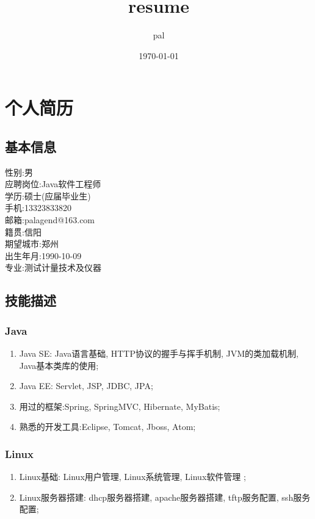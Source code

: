 \documentclass[11pt]{ctexart}
\author{pal}
\date{\today}
\title{resume}
\begin{document}
\maketitle
\tableofcontents

\section{个人简历}
\label{sec-1}
\subsection{基本信息}
\label{sec-1-1}
性别:男\\
应聘岗位:Java软件工程师\\
学历:硕士(应届毕业生)\\
手机:13323833820\\
邮箱:palagend@163.com\\
籍贯:信阳\\
期望城市:郑州\\
出生年月:1990-10-09\\
专业:测试计量技术及仪器\\
\subsection{技能描述}
\label{sec-1-2}
\subsubsection{Java}
\label{sec-1-2-1}
\begin{enumerate}
\item Java SE: Java语言基础, HTTP协议的握手与挥手机制, JVM的类加载机制, Java基本类库的使用;
\item Java EE: Servlet, JSP, JDBC, JPA;
\item 用过的框架:Spring, SpringMVC, Hibernate, MyBatis;
\item 熟悉的开发工具:Eclipse, Tomcat, Jboss, Atom;
\end{enumerate}
\subsubsection{Linux}
\label{sec-1-2-2}
\begin{enumerate}
\item Linux基础: Linux用户管理, Linux系统管理, Linux软件管理 ;
\item Linux服务器搭建: dhcp服务器搭建, apache服务器搭建, tftp服务配置, ssh服务配置;
\end{enumerate}
\end{document}
